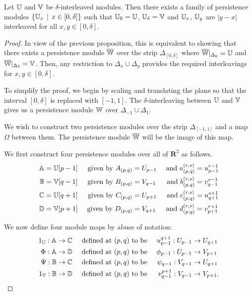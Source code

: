 \begin{lemma}
Let $\mathbb{U}$ and $\mathbb{V}$ be $\delta$-interleaved modules. Then there exists a family of persistence modules $\{\mathbb{U}_x \, \mid \, x \in [0, \delta]\}$ such that $\mathbb{U}_0 = \mathbb{U}$, $\mathbb{U}_\delta = \mathbb{V}$ and $\mathbb{U}_x$, $\mathbb{U}_y$ are $|y-x|$ interleaved for all $x, y \in [0, \delta]$.
\end{lemma}
\begin{proof}
In view of the previous proposition, this is equivalent to showing that there exists a persistence module $\overline{\mathbb{W}}$ over the strip $\Delta_{[0, \delta]}$ where $\overline{\mathbb{W}}|_{\Delta_0} = \mathbb{U}$ and $\overline{\mathbb{W}}|_{\Delta_\delta} = \mathbb{V}$. Then, any restriction to $\Delta_x \cup \Delta_y$ provides the required interleavings for $x,y \in [0, \delta]$.

To simplify the proof, we begin by scaling and translating the plane so that the interval $[0, \delta]$ is replaced with $[-1, 1]$. The $\delta$-interleaving between $\mathbb{U}$ and $\mathbb{V}$ gives us a persistence module $\mathbb{W}$ over $\Delta_{-1} \cup \Delta_1$.

We wish to construct two persistence modules over the strip $\Delta_{[-1, 1]}$ and a map $\Omega$ between them. The persistence module $\overline{\mathbb{W}}$ will be the image of this map.

We first construct four persistence modules over all of $\mathbf{R}^2$ as follows.
\begin{align*}
\mathbb{A} &= \mathbb{U}[p-1] &\text{ given by } A_{(p, q)} &= U_{p-1} &\text{ and } a_{(p, q)}^{(r, s)} &= u_{p-1}^{r-1} \\
\mathbb{B} &= \mathbb{V}[q-1] &\text{ given by } B_{(p, q)} &= V_{q-1} &\text{ and } b_{(p, q)}^{(r, s)} &= v_{q-1}^{s-1} \\
\mathbb{C} &= \mathbb{U}[q+1] &\text{ given by } C_{(p, q)} &= U_{p+1} &\text{ and } c_{(p, q)}^{(r, s)} &= u_{q+1}^{s+1} \\
\mathbb{D} &= \mathbb{V}[p+1] &\text{ given by } D_{(p, q)} &= V_{q+1} &\text{ and } d_{(p, q)}^{(r, s)} &= v_{p+1}^{r+1}
\end{align*}

We now define four module maps by abuse of notation:
\begin{align*}
1_{\mathbb{U}} : \mathbb{A} &\to \mathbb{C} &\text{ defined at } &(p, q) \text{ to be } &u_{p-1}^{q+1} : U_{p-1} &\to U_{q+1}\\
\Phi : \mathbb{A} &\to \mathbb{D} &\text{ defined at } &(p, q) \text{ to be } 
&\phi_{p-1} : U_{p-1} &\to V_{p+1}\\
\Psi : \mathbb{B} &\to \mathbb{C} &\text{ defined at } &(p, q) \text{ to be } &\psi_{q-1} : V_{q-1} &\to U_{q+1}\\
1_{\mathbb{V}} : \mathbb{B} &\to \mathbb{D} &\text{ defined at } &(p, q) \text{ to be } &v_{q-1}^{p+1} : V_{q-1} &\to V_{p+1}.
\end{align*}


\end{proof}
